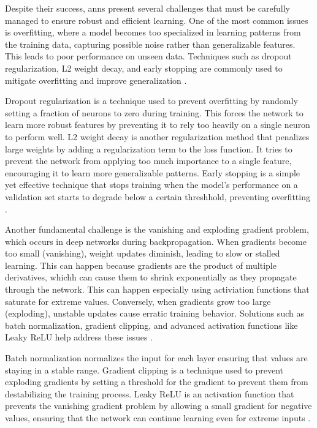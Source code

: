 Despite their success, \ac{ann}s present several challenges that must be carefully managed to ensure robust and efficient learning.
One of the most common issues is overfitting, where a model becomes too specialized in learning patterns from the training data, capturing possible noise rather than generalizable features.
This leads to poor performance on unseen data.
Techniques such as dropout regularization, L2 weight decay, and early stopping are commonly used to mitigate overfitting and improve generalization \cite{pytorchPyTorch,glorot2010understanding}.

Dropout regularization is a technique used to prevent overfitting by randomly setting a fraction of neurons to zero during training.
This forces the network to learn more robust features by preventing it to rely too heavily on a single neuron to perform well.
L2 weight decay is another regularization method that penalizes large weights by adding a regularization term to the loss function.
It tries to prevent the network from applying too much importance to a single feature, encouraging it to learn more generalizable patterns.
Early stopping is a simple yet effective technique that stops training when the model's performance on a validation set starts to degrade below a certain threshhold, preventing overfitting \cite{pytorchPyTorch,glorot2010understanding}.

Another fundamental challenge is the vanishing and exploding gradient problem, which occurs in deep networks during backpropagation.
When gradients become too small (vanishing), weight updates diminish, leading to slow or stalled learning.
This can happen because gradients are the product of multiple derivatives, whichh can cause them to shrink exponentially as they propagate through the network.
This can happen especially using activiation functions that saturate for extreme values.
Conversely, when gradients grow too large (exploding), unstable updates cause erratic training behavior.
Solutions such as batch normalization, gradient clipping, and advanced activation functions like Leaky ReLU help address these issues \cite{pytorchPyTorch,glorot2010understanding}.

Batch normalization normalizes the input for each layer ensuring that values are staying in a stable range.
Gradient clipping is a technique used to prevent exploding gradients by setting a threshold for the gradient to prevent them from destabilizing the training process.
Leaky ReLU is an activation function that prevents the vanishing gradient problem by allowing a small gradient for negative values, ensuring that the network can continue learning even for extreme inputs \cite{pytorchPyTorch,glorot2010understanding}.


